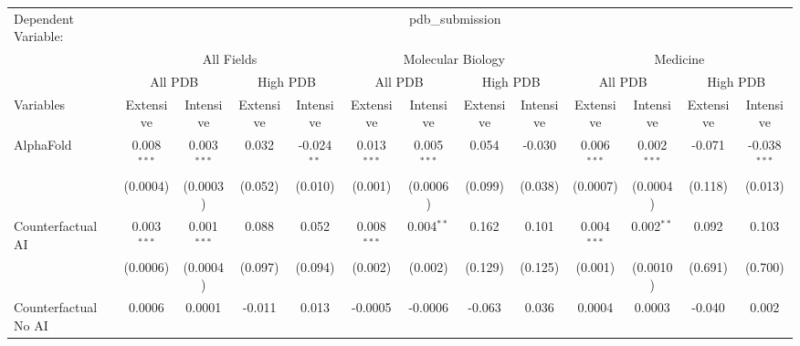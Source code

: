 \begingroup
\centering
\begin{tabular}{lcccccccccccc}
   \tabularnewline \midrule \midrule
   Dependent Variable: & \multicolumn{12}{c}{pdb\_submission}\\
 & \multicolumn{4}{c}{All Fields} & \multicolumn{4}{c}{Molecular Biology} & \multicolumn{4}{c}{Medicine} \\
\cmidrule(lr){2-5} \cmidrule(lr){6-9} \cmidrule(lr){10-13}
 & \multicolumn{2}{c}{All PDB} & \multicolumn{2}{c}{High PDB} & \multicolumn{2}{c}{All PDB} & \multicolumn{2}{c}{High PDB} & \multicolumn{2}{c}{All PDB} & \multicolumn{2}{c}{High PDB} \\
\cmidrule(lr){2-3} \cmidrule(lr){4-5} \cmidrule(lr){6-7} \cmidrule(lr){8-9} \cmidrule(lr){10-11} \cmidrule(lr){12-13}
Variables & \multicolumn{1}{c}{Extensive} & \multicolumn{1}{c}{Intensive} & \multicolumn{1}{c}{Extensive} & \multicolumn{1}{c}{Intensive} & \multicolumn{1}{c}{Extensive} & \multicolumn{1}{c}{Intensive} & \multicolumn{1}{c}{Extensive} & \multicolumn{1}{c}{Intensive} & \multicolumn{1}{c}{Extensive} & \multicolumn{1}{c}{Intensive} & \multicolumn{1}{c}{Extensive} & \multicolumn{1}{c}{Intensive} \\
\cmidrule(lr){1-1}\cmidrule(lr){2-2} \cmidrule(lr){3-3} \cmidrule(lr){4-4} \cmidrule(lr){5-5} \cmidrule(lr){6-6} \cmidrule(lr){7-7} \cmidrule(lr){8-8} \cmidrule(lr){9-9} \cmidrule(lr){10-10} \cmidrule(lr){11-11} \cmidrule(lr){12-12} \cmidrule(lr){13-13}
   AlphaFold                                & 0.008$^{***}$ & 0.003$^{***}$   & 0.032   & -0.024$^{**}$ & 0.013$^{***}$ & 0.005$^{***}$ & 0.054        & -0.030  & 0.006$^{***}$  & 0.002$^{***}$   & -0.071  & -0.038$^{***}$\\   
                                            & (0.0004)      & (0.0003)        & (0.052) & (0.010)       & (0.001)       & (0.0006)      & (0.099)      & (0.038) & (0.0007)       & (0.0004)        & (0.118) & (0.013)\\   
   Counterfactual AI                        & 0.003$^{***}$ & 0.001$^{***}$   & 0.088   & 0.052         & 0.008$^{***}$ & 0.004$^{**}$  & 0.162        & 0.101   & 0.004$^{***}$  & 0.002$^{**}$    & 0.092   & 0.103\\   
                                            & (0.0006)      & (0.0004)        & (0.097) & (0.094)       & (0.002)       & (0.002)       & (0.129)      & (0.125) & (0.001)        & (0.0010)        & (0.691) & (0.700)\\   
   Counterfactual No AI                     & 0.0006        & 0.0001          & -0.011  & 0.013         & -0.0005       & -0.0006       & -0.063       & 0.036   & 0.0004         & 0.0003          & -0.040  & 0.002\\   

\end{tabular}
